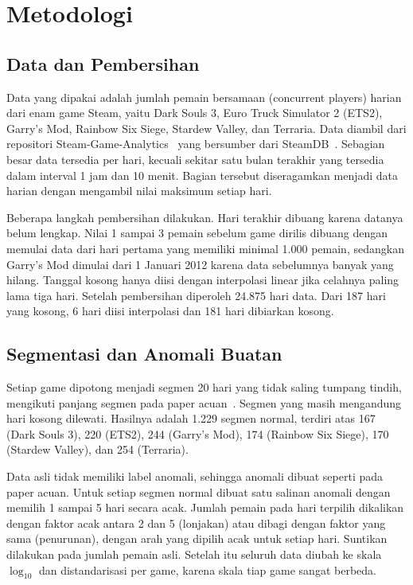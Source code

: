 \section{Metodologi}

\subsection{Data dan Pembersihan}
Data yang dipakai adalah jumlah pemain bersamaan (concurrent players) harian dari enam game Steam, yaitu Dark Souls 3, Euro Truck Simulator 2 (ETS2), Garry's Mod, Rainbow Six Siege, Stardew Valley, dan Terraria. Data diambil dari repositori Steam-Game-Analytics~\cite{steamrepo} yang bersumber dari SteamDB~\cite{steamdb}. Sebagian besar data tersedia per hari, kecuali sekitar satu bulan terakhir yang tersedia dalam interval 1 jam dan 10 menit. Bagian tersebut diseragamkan menjadi data harian dengan mengambil nilai maksimum setiap hari.

Beberapa langkah pembersihan dilakukan. Hari terakhir dibuang karena datanya belum lengkap. Nilai 1 sampai 3 pemain sebelum game dirilis dibuang dengan memulai data dari hari pertama yang memiliki minimal 1.000 pemain, sedangkan Garry's Mod dimulai dari 1 Januari 2012 karena data sebelumnya banyak yang hilang. Tanggal kosong hanya diisi dengan interpolasi linear jika celahnya paling lama tiga hari. Setelah pembersihan diperoleh 24.875 hari data. Dari 187 hari yang kosong, 6 hari diisi interpolasi dan 181 hari dibiarkan kosong.

\subsection{Segmentasi dan Anomali Buatan}
Setiap game dipotong menjadi segmen 20 hari yang tidak saling tumpang tindih, mengikuti panjang segmen pada paper acuan~\cite{rahadian2023}. Segmen yang masih mengandung hari kosong dilewati. Hasilnya adalah 1.229 segmen normal, terdiri atas 167 (Dark Souls 3), 220 (ETS2), 244 (Garry's Mod), 174 (Rainbow Six Siege), 170 (Stardew Valley), dan 254 (Terraria).

Data asli tidak memiliki label anomali, sehingga anomali dibuat seperti pada paper acuan. Untuk setiap segmen normal dibuat satu salinan anomali dengan memilih 1 sampai 5 hari secara acak. Jumlah pemain pada hari terpilih dikalikan dengan faktor acak antara 2 dan 5 (lonjakan) atau dibagi dengan faktor yang sama (penurunan), dengan arah yang dipilih acak untuk setiap hari. Suntikan dilakukan pada jumlah pemain asli. Setelah itu seluruh data diubah ke skala $\log_{10}$ dan distandarisasi per game, karena skala tiap game sangat berbeda.

